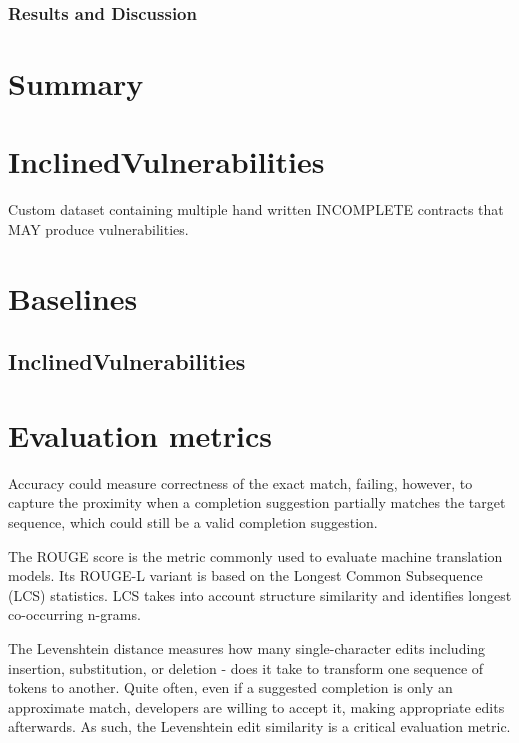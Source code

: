 \subsubsection{Results and Discussion}






\section{Summary}






\section{InclinedVulnerabilities}

Custom dataset containing multiple hand written INCOMPLETE contracts that MAY produce vulnerabilities.


\section{Baselines}
\subsection{InclinedVulnerabilities}

\section{Evaluation metrics}
Accuracy could measure correctness of the exact match, failing, however, to capture the proximity when a completion suggestion partially matches the target sequence, which could still be a valid completion suggestion.

The ROUGE score is the metric commonly used to evaluate machine translation models. Its ROUGE-L variant is based on the Longest Common Subsequence (LCS) statistics. LCS takes into account structure similarity and identifies longest co-occurring n-grams.

The Levenshtein distance measures how many single-character edits  including insertion, substitution, or deletion - does it take to transform one sequence of tokens to another. Quite often, even if a suggested completion is only an approximate match, developers are willing to accept it, making appropriate edits afterwards. As such, the Levenshtein edit similarity is a critical evaluation metric.


